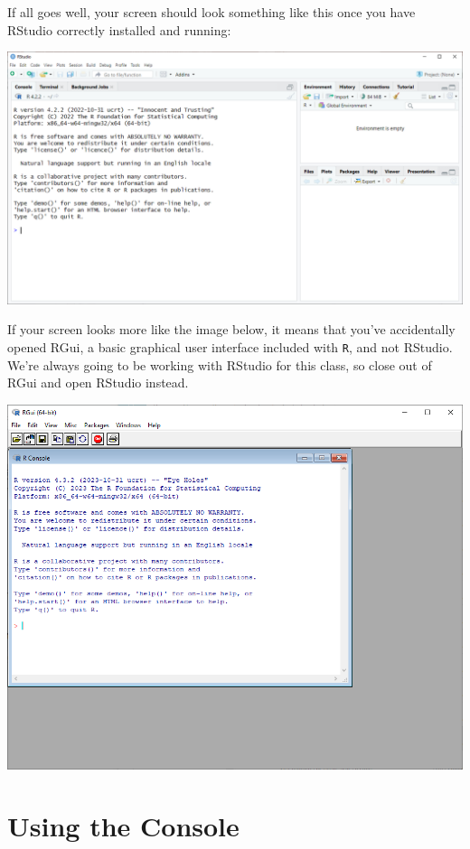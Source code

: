 \documentclass[
  letterpaper,
]{book}
\begin{document}
If all goes well, your screen should look something like this once you
have RStudio correctly installed and running:

\includegraphics{images/RStudio clean install.png}

If your screen looks more like the image below, it means that you've
accidentally opened RGui, a basic graphical user interface included with
\texttt{R}, and not RStudio. We're always going to be working with
RStudio for this class, so close out of RGui and open RStudio instead.

\includegraphics{images/Base R GUI.PNG}

\hypertarget{using-the-console}{%
\section{Using the Console}\label{using-the-console}}
\end{document}
